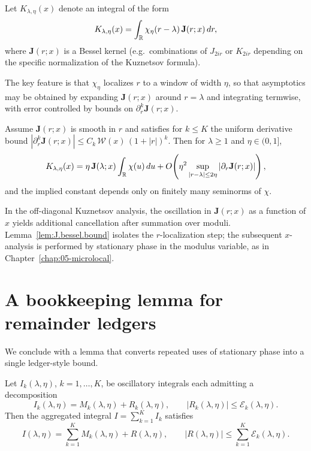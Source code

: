 Let $K_{\lambda,\eta}(x)$ denote an integral of the form
\begin{equation}\label{eq:J.bessel.transform}
K_{\lambda,\eta}(x)
=
\int_{\mathbb{R}} \chi_\eta(r-\lambda)\, \mathbf{J}(r;x)\,dr,
\end{equation}
where $\mathbf{J}(r;x)$ is a Bessel kernel (e.g.\ combinations of $J_{2ir}$ or $K_{2ir}$ depending on the specific
normalization of the Kuznetsov formula).

The key feature is that $\chi_\eta$ localizes $r$ to a window of width $\eta$, so that asymptotics may be obtained by
expanding $\mathbf{J}(r;x)$ around $r=\lambda$ and integrating termwise, with error controlled by bounds on
$\partial_r^k \mathbf{J}(r;x)$.

\begin{lemma}
\label{lem:J.bessel.bound}
Assume $\mathbf{J}(r;x)$ is smooth in $r$ and satisfies for $k\le K$ the uniform derivative bound
$|\partial_r^k \mathbf{J}(r;x)|\le C_k\,\mathcal{W}(x)\,(1+|r|)^k$.
Then for $\lambda\ge 1$ and $\eta\in(0,1]$,
\begin{equation}\label{eq:J.bessel.bound}
K_{\lambda,\eta}(x)
=
\eta\,\mathbf{J}(\lambda;x)\int_{\mathbb{R}}\chi(u)\,du
+
O\!\left(\eta^2 \sup_{|r-\lambda|\le 2\eta} |\partial_r \mathbf{J}(r;x)|\right),
\end{equation}
and the implied constant depends only on finitely many seminorms of $\chi$.
\end{lemma}

\begin{remark}
\label{rem:J.kloosterman}
In the off-diagonal Kuznetsov analysis, the oscillation in $\mathbf{J}(r;x)$ as a function of $x$ yields additional
cancellation after summation over moduli.  Lemma~\ref{lem:J.bessel.bound} isolates the $r$-localization step; the
subsequent $x$-analysis is performed by stationary phase in the modulus variable, as in Chapter~\ref{chap:05-microlocal}.
\end{remark}

\section{A bookkeeping lemma for remainder ledgers}
\label{sec:J.ledger}

We conclude with a lemma that converts repeated uses of stationary phase into a single ledger-style bound.

\begin{lemma}
\label{lem:J.aggregation}
Let $I_k(\lambda,\eta)$, $k=1,\dots,K$, be oscillatory integrals each admitting a decomposition
\[
I_k(\lambda,\eta)=M_k(\lambda,\eta)+R_k(\lambda,\eta),
\qquad
|R_k(\lambda,\eta)|\le \mathcal{E}_k(\lambda,\eta).
\]
Then the aggregated integral $I=\sum_{k=1}^K I_k$ satisfies
\[
I(\lambda,\eta)
=
\sum_{k=1}^K M_k(\lambda,\eta)
+
R(\lambda,\eta),
\qquad
|R(\lambda,\eta)|\le \sum_{k=1}^K \mathcal{E}_k(\lambda,\eta).
\]
\end{lemma}

